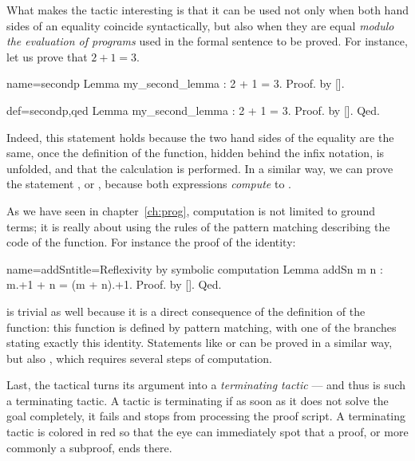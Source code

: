What makes the   tactic interesting is that it
can be used not only when both
hand sides of an equality coincide syntactically, but also when they are
equal \emph{modulo the evaluation of programs} used in the formal
sentence to be proved.
For instance, let us prove that $2 + 1 = 3$.

\begin{coqdef}{name=secondp}
Lemma my_second_lemma : 2 + 1 = 3.
Proof. by [].
\end{coqdef}
\begin{coq}{def=secondp,qed}{}
Lemma my_second_lemma : 2 + 1 = 3.
Proof. by []. Qed.
\end{coq}

Indeed, this statement holds because the two hand sides of the equality
are the same, once the definition of the  function, hidden
behind the infix \C{+} notation, is unfolded, and that the calculation
is performed. In a similar way, we can prove the statement
, or , because both expressions \emph{compute} to
.

As we have seen in chapter~\ref{ch:prog}, computation is not limited
to ground terms; it is really about using the rules of the pattern
matching describing the code of the function. For instance the proof
of the  identity:

\begin{coq}{name=addSn}{title=Reflexivity by symbolic computation}
Lemma addSn m n : m.+1 + n = (m + n).+1. Proof. by []. Qed.
\end{coq}
is trivial as well because it is a direct consequence of the
definition of the  function: this function is defined by
pattern matching, with one of the branches stating exactly this
identity. Statements like
 or  can be proved in a similar way, but
also , which requires several steps of computation.

Last, the  tactical turns its argument into a \emph{terminating
tactic} --- and thus   is such a terminating tactic. A tactic
is terminating if as soon as it does not solve the goal completely, it
fails and stops \Coq{} from processing the proof script.
A terminating tactic is colored in red so that
the eye can immediately spot that a
proof, or more commonly a subproof, ends there.

